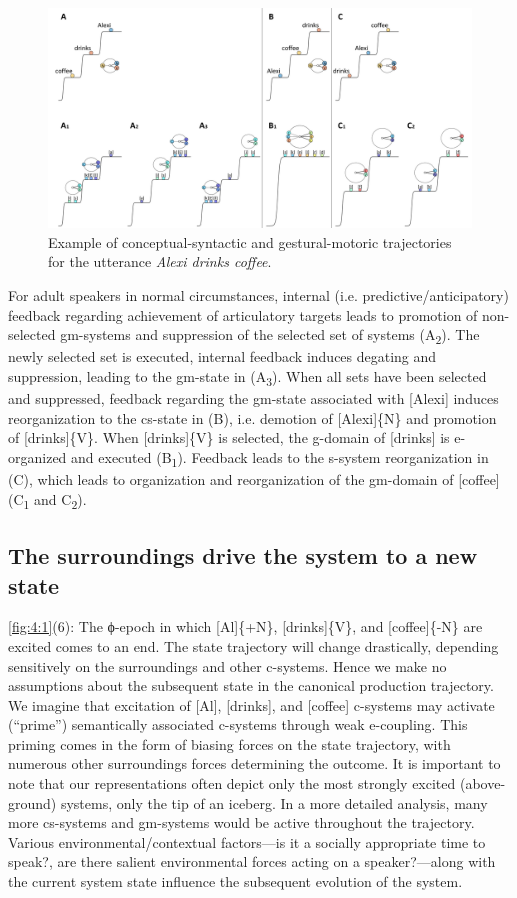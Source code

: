   
\begin{figure}
\includegraphics[width=\textwidth]{figures/Tilsen-img55.png}
\caption{Example of conceptual-syntactic and gestural-motoric trajectories for the utterance \textit{Alexi drinks coffee}.}
\label{fig:4:5}
\end{figure}
 

  For adult speakers in normal circumstances, internal (i.e. predictive/anticipatory) feedback regarding achievement of articulatory targets leads to promotion of non-selected gm-systems and suppression of the selected set of systems (A\textsubscript{2}). The newly selected set is executed, internal feedback induces degating and suppression, leading to the gm-state in (A\textsubscript{3}). When all sets have been selected and suppressed, feedback regarding the gm-state associated with [Alexi] induces reorganization to the cs-state in (B), i.e. demotion of [Alexi]\{N\} and promotion of [drinks]\{V\}. When [drinks]\{V\} is selected, the g-domain of [drinks] is e-organized and executed (B\textsubscript{1}). Feedback leads to the s-system reorganization in (C), which leads to organization and reorganization of the gm-domain of [coffee] (C\textsubscript{1} and C\textsubscript{2}).

\subsection{The surroundings drive the system to a new state}

\ref{fig:4:1}(6): The ϕ-epoch in which [Al]\{+N\}, [drinks]\{V\}, and [coffee]\{-N\} are excited comes to an end. The state trajectory will change drastically, depending sensitively on the surroundings and other c-systems. Hence we make no assumptions about the subsequent state in the canonical production trajectory. We imagine that excitation of [Al], [drinks], and [coffee] c-systems may activate (“prime”) semantically associated c-systems through weak e-coupling. This priming comes in the form of biasing forces on the state trajectory, with numerous other surroundings forces determining the outcome. It is important to note that our representations often depict only the most strongly excited (above-ground) systems, only the tip of an iceberg. In a more detailed analysis, many more cs-systems and gm-systems would be active throughout the trajectory. Various environmental/contextual factors—is it a socially appropriate time to speak?, are there salient environmental forces acting on a speaker?—along with the current system state influence the subsequent evolution of the system. 


